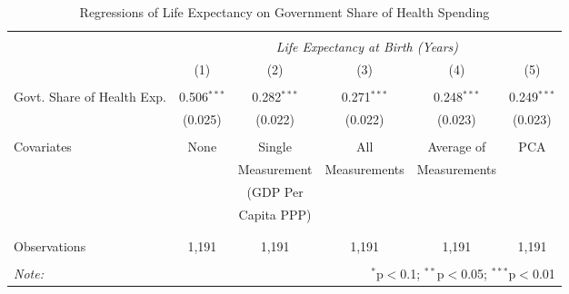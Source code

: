 \begin{table}[!htbp] \centering
  \caption{Regressions of Life Expectancy on Government Share of Health Spending \label{main_regs}}
\begin{tabular}{@{\extracolsep{5pt}}lccccc}
\\[-1.8ex]\hline
\hline \\[-1.8ex]
& \multicolumn{5}{c}{\textit{Life Expectancy at Birth (Years)}} \
\cr \
\\[-1.8ex] & (1) & (2) & (3) & (4) & (5) \\
\hline \\[-1.8ex]
 Govt. Share of Health Exp. & 0.506$^{***}$ & 0.282$^{***}$ & 0.271$^{***}$ & 0.248$^{***}$ & 0.249$^{***}$ \\
  & (0.025) & (0.022) & (0.022) & (0.023) & (0.023) \\
  &  &  &  &  &  \\
 Covariates & None & Single & All & Average of & PCA \\
  &  & Measurement & Measurements & Measurements &  \\
  &  & (GDP Per &  &  &  \\
  &  & Capita PPP) &  &  &  \\
  &  &  &  &  &  \\
\hline \\[-1.8ex]
 Observations & 1,191 & 1,191 & 1,191 & 1,191 & 1,191 \\
\hline
\hline \\[-1.8ex]
\textit{Note:} & \multicolumn{5}{r}{$^{*}$p$<$0.1; $^{**}$p$<$0.05; $^{***}$p$<$0.01} \\
\end{tabular}
\end{table}